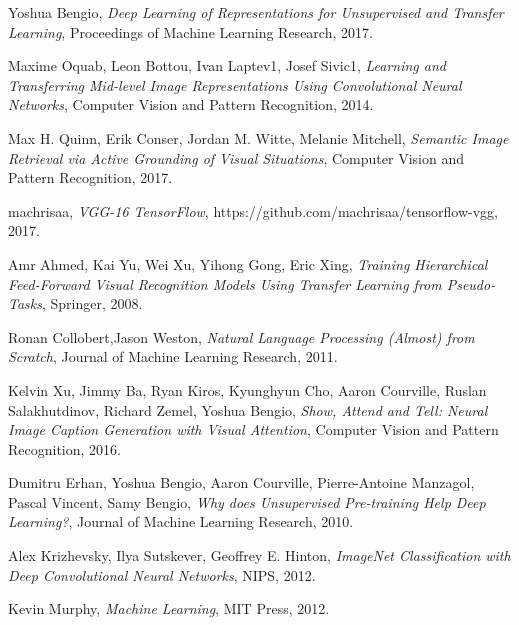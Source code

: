 \documentclass [11pt,letterpaper ,twoside ,openany ]{report}
\begin{document}
\begin{thebibliography}{9}
          Yoshua Bengio,
          \textit{Deep Learning of Representations for Unsupervised and Transfer Learning},
          Proceedings of Machine Learning Research,
          2017.                               

          Maxime Oquab, Leon Bottou, Ivan Laptev1, Josef Sivic1,
          \textit{Learning and Transferring Mid-level Image Representations Using Convolutional Neural Networks},
          Computer Vision and Pattern Recognition,
          2014.

          Max H. Quinn, Erik Conser, Jordan M. Witte, Melanie Mitchell,
          \textit{Semantic Image Retrieval via Active Grounding of Visual Situations},
          Computer Vision and Pattern Recognition,
          2017.          

          machrisaa,
          \textit{VGG-16 TensorFlow},
          https://github.com/machrisaa/tensorflow-vgg,
          2017.                    

          Amr Ahmed, Kai Yu, Wei Xu, Yihong Gong, Eric Xing,
          \textit{Training Hierarchical Feed-Forward Visual Recognition Models Using Transfer Learning from Pseudo-Tasks},
          Springer,
          2008.                                        
          
          Ronan Collobert,Jason Weston,
          \textit{Natural Language Processing (Almost) from Scratch},
          Journal of Machine Learning Research,
          2011.                             

          Kelvin Xu, Jimmy Ba, Ryan Kiros, Kyunghyun Cho, Aaron Courville, Ruslan Salakhutdinov, Richard Zemel, Yoshua Bengio,
          \textit{Show, Attend and Tell: Neural Image Caption Generation with Visual Attention},
          Computer Vision and Pattern Recognition,
          2016.                                

          Dumitru Erhan, Yoshua Bengio, Aaron Courville, Pierre-Antoine Manzagol, Pascal Vincent, Samy Bengio,
          \textit{Why does Unsupervised Pre-training Help Deep Learning?},
          Journal of Machine Learning Research,
          2010.                                       

          Alex Krizhevsky, Ilya Sutskever, Geoffrey E. Hinton,
          \textit{ImageNet Classification with Deep Convolutional Neural Networks},
          NIPS,
          2012.        

          Kevin Murphy,
          \textit{Machine Learning},
          MIT Press,
          2012.            

    \end{thebibliography}
\end{document}
